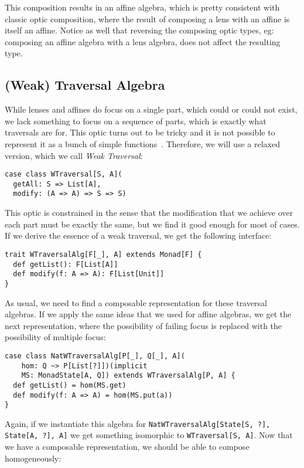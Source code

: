 \documentclass[preview, 3p]{elsarticle}
\begin{document}
This composition results in an affine algebra, which is pretty consistent with
classic optic composition, where the result of composing a lens with an affine
is itself an affine. Notice as well that reversing the composing optic types,
eg: composing an affine algebra with a lens algebra, does not affect the
resulting type.

\subsection{(Weak) Traversal Algebra}

While lenses and affines do focus on a single part, which could or could not
exist, we lack something to focus on a sequence of parts, which is exactly what
traversals are for. This optic turns out to be tricky and it is not possible to
represent it as a bunch of simple functions~\cite{oconnor2011functor}.
Therefore, we will use a relaxed version, which we call \emph{Weak Traversal}:

\begin{lstlisting}
case class WTraversal[S, A](
  getAll: S => List[A],
  modify: (A => A) => S => S)
\end{lstlisting}

This optic is constrained in the sense that the modification that we achieve
over each part must be exactly the same, but we find it good enough for most of
cases. If we derive the essence of a weak traversal, we get the following
interface:

\begin{lstlisting}
trait WTraversalAlg[F[_], A] extends Monad[F] {
  def getList(): F[List[A]]
  def modify(f: A => A): F[List[Unit]]
}
\end{lstlisting}

As usual, we need to find a composable representation for these traversal
algebras. If we apply the same ideas that we used for affine algebras, we get
the next representation, where the possibility of failing focus is replaced with
the possibility of multiple focus:

\begin{lstlisting}
case class NatWTraversalAlg[P[_], Q[_], A](
    hom: Q ~> P[List[?]])(implicit
    MS: MonadState[A, Q]) extends WTraversalAlg[P, A] {
  def getList() = hom(MS.get)
  def modify(f: A => A) = hom(MS.put(a))
}
\end{lstlisting}

Again, if we instantiate this algebra for
\lstinline{NatWTraversalAlg[State[S, ?], State[A, ?], A]} we get something
isomorphic to \lstinline{WTraversal[S, A]}. Now that we have a composable
representation, we should be able to compose homogeneously:
\end{document}
